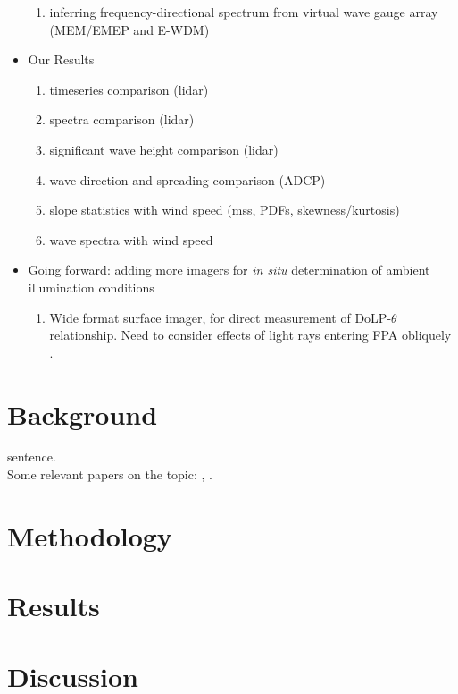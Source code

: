 \documentclass[letterpaper,journal]{IEEEtran}
\begin{document}
\begin{itemize}
\begin{enumerate}
        \item inferring frequency-directional spectrum from virtual wave gauge array (MEM/EMEP and E-WDM)
    \end{enumerate}
    \item Our Results
    \begin{enumerate}
        \item timeseries comparison (lidar)
        \item spectra comparison (lidar)
        \item significant wave height comparison (lidar)
        \item wave direction and spreading comparison (ADCP)
        \item slope statistics with wind speed (mss, PDFs, skewness/kurtosis)
        \item wave spectra with wind speed
    \end{enumerate}
    \item Going forward: adding more imagers for \emph{in situ} determination of ambient illumination conditions
    \begin{enumerate}
        \item Wide format surface imager, for direct measurement of DoLP-$\theta$ relationship. Need to consider effects of light rays entering FPA obliquely \cite{pistellato_geometric_2024}.
    \end{enumerate}
\end{itemize}

\section{Background}
\label{sec:intro}
 sentence.\\

Some relevant papers on the topic: \cite{Zappa2008}, \cite{laxague_effects_2025}.

\section{Methodology}
\label{sec:methodology}

\section{Results}
\label{sec:results}

\section{Discussion}
\label{sec:discussion}
\end{document}
